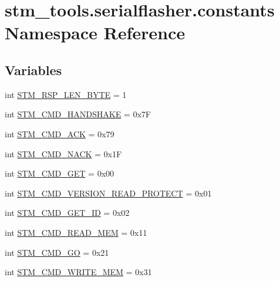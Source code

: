 \hypertarget{namespacestm__tools_1_1serialflasher_1_1constants}{}\section{stm\+\_\+tools.\+serialflasher.\+constants Namespace Reference}
\label{namespacestm__tools_1_1serialflasher_1_1constants}
\subsection*{Variables}
\begin{DoxyCompactItemize}
\item 
int \hyperlink{namespacestm__tools_1_1serialflasher_1_1constants_a8355cfda6a22b054771cec379e3687a9}{S\+T\+M\+\_\+\+R\+S\+P\+\_\+\+L\+E\+N\+\_\+\+B\+Y\+TE} = 1
\item 
int \hyperlink{namespacestm__tools_1_1serialflasher_1_1constants_a9fd4e692bfbfdcfce2aa0967c695b9cb}{S\+T\+M\+\_\+\+C\+M\+D\+\_\+\+H\+A\+N\+D\+S\+H\+A\+KE} = 0x7F
\item 
int \hyperlink{namespacestm__tools_1_1serialflasher_1_1constants_ac28ce0ad36785d1cd97a9341888c4e87}{S\+T\+M\+\_\+\+C\+M\+D\+\_\+\+A\+CK} = 0x79
\item 
int \hyperlink{namespacestm__tools_1_1serialflasher_1_1constants_aea0ea6655468a1b515f3ecc5c77fe132}{S\+T\+M\+\_\+\+C\+M\+D\+\_\+\+N\+A\+CK} = 0x1F
\item 
int \hyperlink{namespacestm__tools_1_1serialflasher_1_1constants_aec187f355bbd8d75889a8a888703b561}{S\+T\+M\+\_\+\+C\+M\+D\+\_\+\+G\+ET} = 0x00
\item 
int \hyperlink{namespacestm__tools_1_1serialflasher_1_1constants_a96496172df5836557db4edf3682fd14f}{S\+T\+M\+\_\+\+C\+M\+D\+\_\+\+V\+E\+R\+S\+I\+O\+N\+\_\+\+R\+E\+A\+D\+\_\+\+P\+R\+O\+T\+E\+CT} = 0x01
\item 
int \hyperlink{namespacestm__tools_1_1serialflasher_1_1constants_a9e6ba502dc8cf71e3ca09af43a27b50e}{S\+T\+M\+\_\+\+C\+M\+D\+\_\+\+G\+E\+T\+\_\+\+ID} = 0x02
\item 
int \hyperlink{namespacestm__tools_1_1serialflasher_1_1constants_a8a10a83309fd510330b5453140cb3516}{S\+T\+M\+\_\+\+C\+M\+D\+\_\+\+R\+E\+A\+D\+\_\+\+M\+EM} = 0x11
\item 
int \hyperlink{namespacestm__tools_1_1serialflasher_1_1constants_a98d4a1a9acc50ab78d8916ab797db74a}{S\+T\+M\+\_\+\+C\+M\+D\+\_\+\+GO} = 0x21
\item 
int \hyperlink{namespacestm__tools_1_1serialflasher_1_1constants_a88a947d173ce28afd93ef7937e3c17be}{S\+T\+M\+\_\+\+C\+M\+D\+\_\+\+W\+R\+I\+T\+E\+\_\+\+M\+EM} = 0x31

\end{DoxyCompactItemize}
